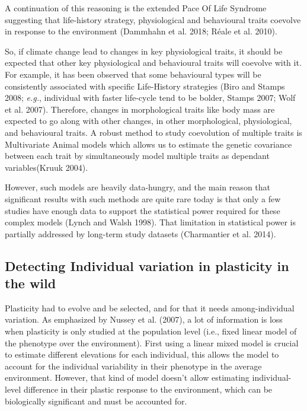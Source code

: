 \documentclass[
  12pt,
  letterpaper,
]{scrartcl}
\begin{document}
A continuation of this reasoning is the extended Pace Of Life Syndrome
suggesting that life-history strategy, physiological and behavioural
traits coevolve in response to the environment (Dammhahn et al. 2018;
Réale et al. 2010).

So, if climate change lead to changes in key physiological traits, it
should be expected that other key physiological and behavioural traits
will coevolve with it. For example, it has been observed that some
behavioural types will be consistently associated with specific
Life-History strategies (Biro and Stamps 2008; \emph{e.g.}, individual
with faster life-cycle tend to be bolder, Stamps 2007; Wolf et al.
2007). Therefore, changes in morphological traits like body mass are
expected to go along with other changes, in other morphological,
physiological, and behavioural traits. A robust method to study
coevolution of multiple traits is Multivariate Animal models which
allows us to estimate the genetic covariance between each trait by
simultaneously model multiple traits as dependant variables(Kruuk 2004).

However, such models are heavily data-hungry, and the main reason that
significant results with such methods are quite rare today is that only
a few studies have enough data to support the statistical power required
for these complex models (Lynch and Walsh 1998). That limitation in
statistical power is partially addressed by long-term study datasets
(Charmantier et al. 2014).

\subsection{Detecting Individual variation in plasticity in the
wild}\label{detecting-individual-variation-in-plasticity-in-the-wild}

Plasticity had to evolve and be selected, and for that it needs
among-individual variation. As emphasized by Nussey et al. (2007), a lot
of information is loss when plasticity is only studied at the population
level (i.e., fixed linear model of the phenotype over the environment).
First using a linear mixed model is crucial to estimate different
elevations for each individual, this allows the model to account for the
individual variability in their phenotype in the average environment.
However, that kind of model doesn't allow estimating individual-level
difference in their plastic response to the environment, which can be
biologically significant and must be accounted for.
\end{document}

